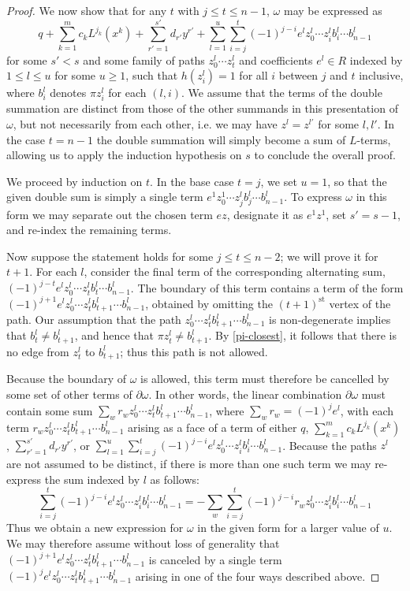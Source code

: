 \documentclass[11pt]{article}
\theoremstyle{definition}
\numberwithin{equation}{section}
\newcommand{\bd}{\partial}
\begin{document}
\begin{proof}
We now show that for any $t$ with $j \leq t \leq n-1$, $\omega$ may be expressed as
\[
q + \sum_{k=1}^m c_k L^{j_k}(x^k) + \sum_{r' = 1}^{s'} d_{r'} y^{r'} + \sum_{l = 1}^{u} \sum_{i = j}^{t} (-1)^{j-i} e^l z^l_0 \cdots z^l_i b^l_i \cdots b^l_{n-1}
\]
for some $s' < s$ and some family of paths $z^l_0 \cdots z^l_t$ and coefficients $e^l \in R$ indexed by $1 \leq l \leq u$ for some $u \geq 1$, such that $h(z^l_i) = 1$ for all $i$ between $j$ and $t$ inclusive, where $b^l_i$ denotes $\pi z^l_i$ for each $(l,i)$. We assume that the terms of the double summation are distinct from those of the other summands in this presentation of $\omega$, but not necessarily from each other, i.e. we may have $z^l = z^{l'}$ for some $l, l'$. In the case $t = n-1$ the double summation will simply become a sum of $L$-terms, allowing us to apply the induction hypothesis on $s$ to conclude the overall proof.

We proceed by induction on $t$. In the base case $t = j$, we set $u = 1$, so that the given double sum is simply a single term $ e^1 z^1_0 \cdots z^l_j b^l_j \cdots b^l_{n-1}$. To express $\omega$ in this form we may separate out the chosen term $e z$, designate it as $e^1 z^1$, set $s' = s-1$, and re-index the remaining terms.

Now suppose the statement holds for some $j \leq t \leq n - 2$; we will prove it for $t + 1$. For each $l$, consider the final term of the corresponding alternating sum, $(-1)^{j-t}e^l z^l_0 \cdots z^l_t b^l_t \cdots b^l_{n-1}$. The boundary of this term contains a term of the form $(-1)^{j+1} e^l z^l_0 \cdots z^l_t b^l_{t+1} \cdots b^l_{n-1}$, obtained by omitting the $(t+1)^{\mathrm{st}}$ vertex of the path. Our assumption that the path $z^l_0 \cdots z^l_t b^l_{t+1} \cdots b^l_{n-1}$ is non-degenerate implies that $b^l_t \neq b^l_{t+1}$, and hence that $\pi z^l_t \neq b^l_{t+1}$. By \cref{pi-closest}, it follows that there is no edge from $z^l_t$ to $b^l_{t+1}$; thus this path is not allowed. 

Because the boundary of $\omega$ is allowed, this term must therefore be cancelled by some set of other terms of $\bd \omega$. In other words, the linear combination $\bd \omega$ must contain some sum $\sum_{w} r_w z^l_0 \cdots z^l_t b^l_{t+1} \cdots b^l_{n-1}$, where $\sum_w r_w = (-1)^j e^l$, with each term $r_w z^l_0 \cdots z^l_t b^l_{t+1} \cdots b^l_{n-1}$ arising as a face of a term of either $q$, $\sum_{k=1}^m c_k L^{j_k}(x^k)$, $\sum_{r' = 1}^{s'} d_{r'} y^{r'}$, or $\sum_{l=1}^u \sum_{i = j}^{t} (-1)^{j-i} e^l z^l_0 \cdots z^l_i b^l_i \cdots b^l_{n-1}$. Because the paths $z^l$ are not assumed to be distinct, if there is more than one such term we may re-express the sum indexed by $l$ as follows:
\[
\sum_{i=j}^t (-1)^{j-i}e^l z^l_0 \cdots z^l_i b^l_i \cdots b^l_{n-1} 
= -\sum_w \sum_{i=j}^t (-1)^{j-i}r_w z^l_0 \cdots z^l_i b^l_i \cdots b^l_{n-1}
\]
Thus we obtain a new expression for $\omega$ in the given form for a larger value of $u$. We may therefore assume without loss of generality that $(-1)^{j+1} e^l z^l_0 \cdots z^l_t b^l_{t+1} \cdots b^l_{n-1}$ is canceled by a single term $(-1)^{j} e^l z^l_0 \cdots z^l_t b^l_{t+1} \cdots b^l_{n-1}$ arising in one of the four ways described above.


\end{proof}
\end{document}

